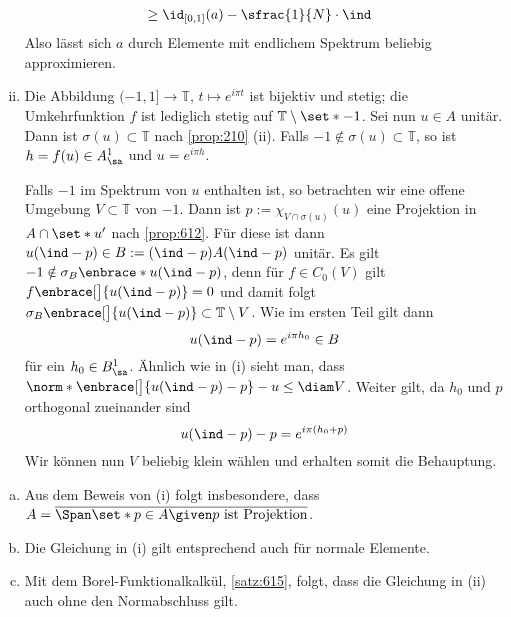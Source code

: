 \begin{beweis}
\begin{enumerate}[(i)]
\begin{align}
			&\ge \id_{[0,1]}(a) - \sfrac{1}{N} \cdot \ind 
		\end{align}
		Also lässt sich $a$ durch Elemente mit endlichem Spektrum beliebig approximieren.
		\item Die Abbildung $(-1,1] \to \mathbb{T}$, $t \mapsto e^{i \pi t}$ ist bijektiv und stetig; die Umkehrfunktion $f$ ist lediglich stetig auf $\mathbb{T} \setminus \set*{-1}$.
		Sei nun $u \in A$ unitär. 
		Dann ist $\sigma(u) \subset \mathbb{T}$ nach \autoref{prop:210} (ii).
		Falls $-1 \notin \sigma(u) \subset \mathbb{T}$, so ist $h=f(u) \in A_\sa^1$ und $u=e^{i \pi h}$.
		
		Falls $-1$ im Spektrum von $u$ enthalten ist, so betrachten wir eine offene Umgebung $V \subset \mathbb{T}$ von $-1$.
		Dann ist $p:= \chi_{V\cap \sigma(u)}(u)$ eine Projektion in $A \cap \set*{u}'$ nach \autoref{prop:612}.
		Für diese ist dann $u(\ind-p) \in B := (\ind-p)A(\ind-p)$ unitär.
		Es gilt $-1 \notin \sigma_B \enbrace*{u(\ind-p)}$, denn für $f \in C_0(V)$ gilt $f \enbrace[\big]{u(\ind-p)}=0$ und damit folgt $\sigma_B \enbrace[\big]{u(\ind-p)} \subset \mathbb{T}\setminus V$.
		Wie im ersten Teil gilt dann
		\[
			u(\ind-p)= e^{i \pi h_0} \in B
		\]
		für ein $h_0 \in B_\sa^1$. 
		Ähnlich wie in (i) sieht man, dass 
		\(
			\norm*{\enbrace[\big]{u(\ind-p) -p} -u} \le \diam V
		\).
		Weiter gilt, da $h_0$ und $p$ orthogonal zueinander sind
		\[
			u(\ind-p) - p = e^{i \pi(h_0+p)} 
		\]
		Wir können nun $V$ beliebig klein wählen und erhalten somit die Behauptung.\qedhere
	\end{enumerate}
\end{beweis}

\begin{bemerkung}[{name=[Folgerungen aus \autoref{korr:613}]},label=bem:614]
	\leavevmode
	\begin{enumerate}[a),itemsep=0pt]
		\item Aus dem Beweis von (i) folgt insbesondere, dass $A= \overline{\Span \set*{p \in A \given p\text{ ist Projektion}}}$.
		\item Die Gleichung in (i) gilt entsprechend auch für normale Elemente.
		\item Mit dem Borel-Funktionalkalkül, \autoref{satz:615}, folgt, dass die Gleichung in (ii) auch ohne den Normabschluss gilt.
	\end{enumerate}
\end{bemerkung}

